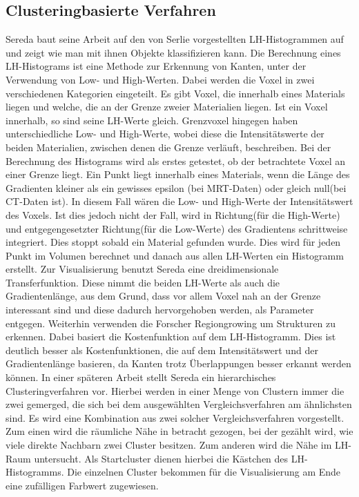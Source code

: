 \subsection{Clusteringbasierte Verfahren}


Sereda baut seine Arbeit \cite{sereda2006visualization} auf den von Serlie \cite{serlie2003computed} vorgestellten LH-Histogrammen auf und zeigt wie man mit ihnen Objekte klassifizieren kann.
\newline
Die Berechnung eines LH-Histograms ist eine Methode zur Erkennung von Kanten, unter der Verwendung von Low- und High-Werten. Dabei werden die Voxel in zwei verschiedenen Kategorien eingeteilt. Es gibt Voxel, die  innerhalb eines Materials liegen und welche, die  an der Grenze zweier Materialien liegen. Ist ein Voxel innerhalb, so sind seine LH-Werte gleich. Grenzvoxel hingegen haben unterschiedliche Low- und High-Werte, wobei diese die Intensitätswerte der beiden Materialien, zwischen denen die Grenze verläuft, beschreiben. 
\newline
Bei der Berechnung des Histograms wird als erstes getestet, ob der betrachtete Voxel an einer Grenze liegt. Ein Punkt liegt innerhalb eines Materials, wenn  die Länge des Gradienten kleiner als ein gewisses epsilon (bei MRT-Daten) oder gleich null(bei CT-Daten ist). In diesem Fall wären die Low- und High-Werte der Intensitätswert des Voxels. Ist dies jedoch nicht der Fall, wird in Richtung(für die High-Werte) und entgegengesetzter Richtung(für die Low-Werte) des Gradientens schrittweise integriert. Dies stoppt sobald ein Material gefunden wurde. Dies wird für jeden Punkt im Volumen berechnet und danach aus allen LH-Werten ein Histogramm erstellt.
\newline 
Zur Visualisierung benutzt Sereda eine dreidimensionale Transferfunktion. Diese nimmt die beiden LH-Werte als auch die Gradientenlänge, aus dem Grund, dass vor allem Voxel nah an der Grenze interessant sind und diese dadurch hervorgehoben werden, als Parameter entgegen.
\newline
Weiterhin verwenden die Forscher Regiongrowing um Strukturen zu erkennen. Dabei basiert die Kostenfunktion auf dem LH-Histogramm. Dies ist deutlich besser als Kostenfunktionen, die auf dem Intensitätswert und der Gradientenlänge basieren, da Kanten trotz Überlappungen besser erkannt werden können.
\newline
\newline
In einer späteren Arbeit \cite{sereda2006automating} stellt Sereda ein hierarchisches Clusteringverfahren vor. Hierbei werden in einer Menge von Clustern immer die zwei gemerged, die sich bei dem ausgewählten Vergleichsverfahren am ähnlichsten sind. Es wird eine Kombination aus zwei solcher Vergleichsverfahren vorgestellt. Zum einen wird die räumliche Nähe in betracht gezogen, bei der gezählt wird, wie viele direkte Nachbarn zwei Cluster besitzen. Zum anderen wird die Nähe im LH-Raum untersucht. Als Startcluster dienen hierbei die Kästchen des LH-Histogramms. Die einzelnen Cluster bekommen für die Visualisierung am Ende eine zufälligen Farbwert zugewiesen. 



